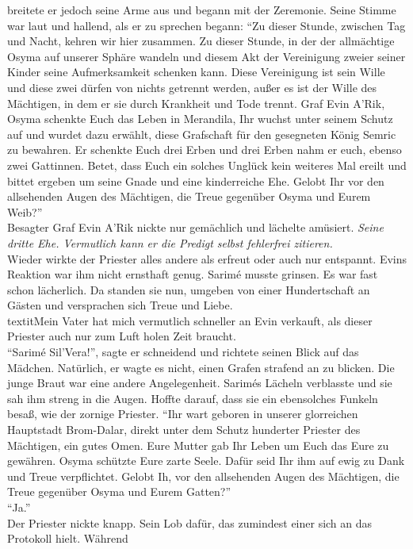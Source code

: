 breitete er jedoch seine Arme aus und begann mit der Zeremonie. Seine Stimme war laut und hallend, 
als er zu sprechen begann: ``Zu dieser Stunde, zwischen Tag und Nacht, kehren wir hier zusammen. Zu 
dieser Stunde, in der der allmächtige Osyma auf unserer Sphäre wandeln und diesem Akt der 
Vereinigung zweier seiner Kinder seine Aufmerksamkeit schenken kann. Diese Vereinigung ist sein 
Wille und diese zwei dürfen von nichts getrennt werden, außer es ist der Wille des Mächtigen, in 
dem er sie durch Krankheit und Tode trennt. Graf Evin A’Rik, Osyma schenkte Euch das Leben in 
Merandila, Ihr wuchst unter seinem Schutz auf und wurdet dazu erwählt, diese Grafschaft für den 
gesegneten König Semric zu bewahren. Er schenkte Euch drei Erben und drei Erben nahm er euch, 
ebenso zwei Gattinnen. Betet, dass Euch ein solches Unglück kein weiteres Mal ereilt und bittet 
ergeben um seine Gnade und eine kinderreiche Ehe. Gelobt Ihr vor den allsehenden Augen des 
Mächtigen, die Treue gegenüber Osyma und Eurem Weib?''\\
Besagter Graf Evin A'Rik nickte nur gemächlich und lächelte amüsiert. \textit{Seine dritte Ehe. 
Vermutlich kann er die Predigt selbst fehlerfrei zitieren.}\\
Wieder wirkte der Priester alles andere als erfreut oder auch nur entspannt. Evins Reaktion war ihm 
nicht ernsthaft genug. Sarimé musste grinsen. Es war fast schon lächerlich. Da standen sie nun, 
umgeben von einer Hundertschaft an Gästen und versprachen sich Treue und Liebe.
\\textit{Mein Vater hat mich vermutlich schneller an Evin verkauft, als dieser Priester auch nur 
zum Luft holen Zeit braucht.}\\
``Sarimé Sil'Vera!'', sagte er schneidend und richtete seinen Blick auf das Mädchen.
Natürlich, er wagte es nicht, einen Grafen strafend an zu blicken. Die junge Braut war eine andere 
Angelegenheit. Sarimés Lächeln verblasste und sie sah ihm streng in die Augen. Hoffte darauf, dass 
sie ein ebensolches Funkeln besaß, wie der zornige Priester.
``Ihr wart geboren in unserer glorreichen Hauptstadt Brom-Dalar, direkt unter dem Schutz hunderter 
Priester des Mächtigen, ein gutes Omen. Eure Mutter gab Ihr Leben um Euch das Eure zu gewähren. 
Osyma schützte Eure zarte Seele. Dafür seid Ihr ihm auf ewig zu Dank und Treue verpflichtet. Gelobt 
Ih, vor den allsehenden Augen des Mächtigen, die Treue gegenüber Osyma und Eurem Gatten?''\\
``Ja.''\\
Der Priester nickte knapp. Sein Lob dafür, das zumindest einer sich an das Protokoll hielt. Während 
